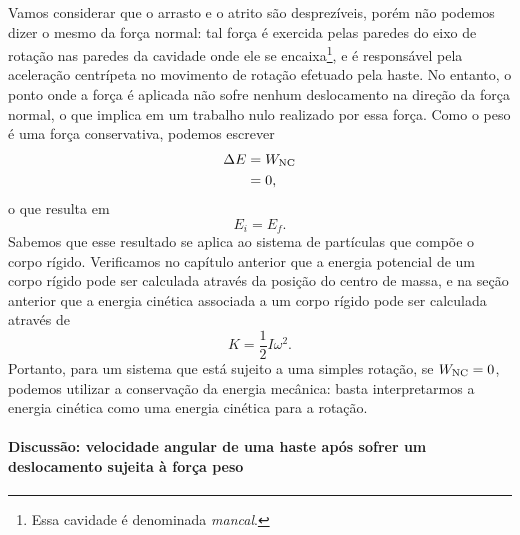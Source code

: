 Vamos considerar que o arrasto e o atrito são desprezíveis, porém não podemos dizer o mesmo da força normal: tal força é exercida pelas paredes do eixo de rotação nas paredes da cavidade onde ele se encaixa\footnote{Essa cavidade é denominada \emph{mancal}.}, e é responsável pela aceleração centrípeta no movimento de rotação efetuado pela haste. No entanto, o ponto onde a força é aplicada não sofre nenhum deslocamento na direção da força normal, o que implica em um trabalho nulo realizado por essa força. Como o peso é uma força conservativa, podemos escrever
\begin{align}
    \Delta E &= W_{\rm{NC}} \\
    &= 0,
\end{align}
%
o que resulta em
\begin{equation}
    E_i = E_f.
\end{equation}
%
Sabemos que esse resultado se aplica ao sistema de partículas que compõe o corpo rígido. Verificamos no capítulo anterior que a energia potencial de um corpo rígido pode ser calculada através da posição do centro de massa, e na seção anterior que a energia cinética associada a um corpo rígido pode ser calculada através de 
\begin{equation}
    K = \frac{1}{2} I\omega^2.
\end{equation}
%
Portanto, para um sistema que está sujeito a uma simples rotação, se $W_{\rm{NC}} = 0$, podemos utilizar a conservação da energia mecânica: basta interpretarmos a energia cinética como uma energia cinética para a rotação.

\paragraph{Discussão: velocidade angular de uma haste após sofrer um deslocamento sujeita à força peso}

